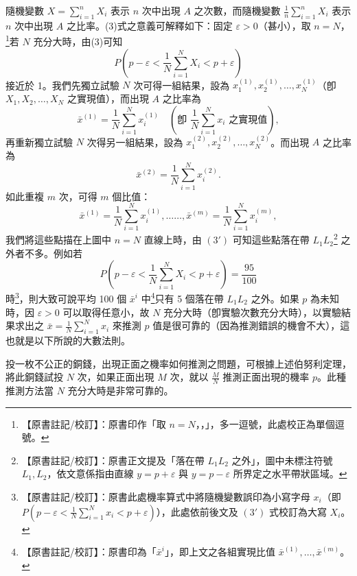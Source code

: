 隨機變數 $X = \sum_{i=1}^n X_i$ 表示 $n$ 次中出現 $A$ 之次數，而隨機變數 $\frac{1}{n}\sum_{i=1}^n X_i$ 表示 $n$ 次中出現 $A$ 之比率。(3)式之意義可解釋如下：固定 $\varepsilon > 0$（甚小），取 $n = N$，\label{note:b5s-ch5-p164-comma}\footnote{【原書註記/校訂】：原書印作「取 $n = N$，，」，多一逗號，此處校正為單個逗號。}若 $N$ 充分大時，由(3)可知
\begin{equation}
P\left(p - \varepsilon < \frac{1}{N}\sum_{i=1}^N X_i < p + \varepsilon\right) \tag{$3'$}\label{eq:b5s-5-3-3prime}
\end{equation}
接近於 1。我們先獨立試驗 $N$ 次可得一組結果，設為 $x_1^{(1)}, \allowbreak x_2^{(1)}, \allowbreak \dots, \allowbreak x_N^{(1)}$（卽 $X_1, \allowbreak X_2, \allowbreak \dots, \allowbreak X_N$ 之實現值），而出現 $A$ 之比率為
\[
\bar{x}^{(1)} = \frac{1}{N}\sum_{i=1}^N x_i^{(1)} \quad \left(\text{卽 } \frac{1}{N}\sum_{i=1}^N x_i \text{ 之實現值}\right),
\]
再重新獨立試驗 $N$ 次得另一組結果，設為 $x_1^{(2)}, x_2^{(2)}, \dots, x_N^{(2)}$。而出現 $A$ 之比率為
\[
\bar{x}^{(2)} = \frac{1}{N}\sum_{i=1}^N x_i^{(2)}.
\]
如此重複 $m$ 次，可得 $m$ 個比值：
\[
\bar{x}^{(1)} = \frac{1}{N}\sum_{i=1}^N x_i^{(1)}, \dots\dots, \bar{x}^{(m)} = \frac{1}{N}\sum_{i=1}^N x_i^{(m)},
\]
我們將這些點描在上圖中 $n = N$ 直線上時，由 $(3')$ 可知這些點落在帶 $L_1 L_2$\label{note:b5s-ch5-p164-strip}\footnote{【原書註記/校訂】：原書正文提及「落在帶 $L_1 L_2$ 之外」，圖中未標注符號 $L_1, L_2$，依文意係指由直線 $y = p + \varepsilon$ 與 $y = p - \varepsilon$ 所界定之水平帶狀區域。} 之外者不多。例如若
\[
P\left(p - \varepsilon < \frac{1}{N}\sum_{i=1}^N X_i < p + \varepsilon\right) = \frac{95}{100}
\]
時\label{note:b5s-ch5-p164-rv}\footnote{【原書註記/校訂】：原書此處機率算式中將隨機變數誤印為小寫字母 $x_i$（即 $P(p-\varepsilon < \frac{1}{N}\sum_{i=1}^N x_i < p+\varepsilon)$），此處依前後文及 $(3')$ 式校訂為大寫 $X_i$。}，則大致可說平均 100 個 $\bar{x}^i$ 中\label{note:b5s-ch5-p164-xi}\footnote{【原書註記/校訂】：原書印為「$\bar{x}^i$」，即上文之各組實現比值 $\bar{x}^{(1)}, \dots, \bar{x}^{(m)}$。}只有 5 個落在帶 $L_1 L_2$ 之外。如果 $p$ 為未知時，因 $\varepsilon > 0$ 可以取得任意小，故 $N$ 充分大時（卽實驗次數充分大時），以實驗結果求出之 $\bar{x} = \frac{1}{N}\sum_{i=1}^N x_i$ 來推測 $p$ 值是很可靠的（因為推測錯誤的機會不大），這也就是以下所說的大數法則。

\medskip
\begin{discussion}\label{disc:b5s-5-2}
投一枚不公正的銅錢，出現正面之機率如何推測之問題，可根據上述伯努利定理，將此銅錢試投 $N$ 次，如果正面出現 $M$ 次，就以 $\frac{M}{N}$ 推測正面出現的機率 $p$。此種推測方法當 $N$ 充分大時是非常可靠的。
\end{discussion}

